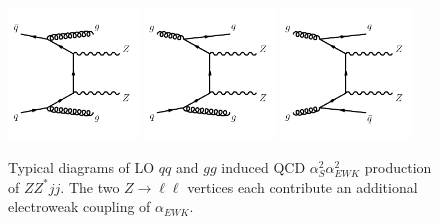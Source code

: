\begin{figure}[!htbp]
  \begin{center}
  \includegraphics[width=0.31\textwidth]{figures/Theory/diagramQCDZZjjqq.pdf}
  \includegraphics[width=0.31\textwidth]{figures/Theory/diagramQCDZZjjqg.pdf}
  \includegraphics[width=0.31\textwidth]{figures/Theory/diagramQCDZZjjgg.pdf}
   \end{center}
  \caption{Typical diagrams of LO $qq$ and $gg$ induced QCD $\alpha_{S}^2 \alpha_{EWK}^{2}$ production of $ZZ^*jj$. The two $Z\rightarrow \ell \ell$ vertices each contribute an additional electroweak coupling of $\alpha_{EWK}$. \label{fig:ZZjjFeynmanDiag_QCD_qq}}
 \end{figure} 
 
